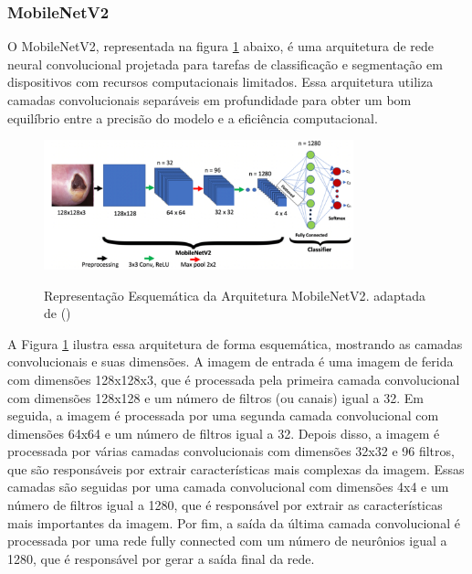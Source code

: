     \subsubsection{MobileNetV2}

        O \ac{MobileNetV2}, representada na figura \ref{fig:arquiteturaMobileNetV2} abaixo, é uma arquitetura de rede neural convolucional projetada para tarefas de classificação e segmentação em dispositivos com recursos computacionais limitados. Essa arquitetura utiliza camadas convolucionais separáveis em profundidade para obter um bom equilíbrio entre a precisão do modelo e a eficiência computacional.
    
            \begin{figure}[htbp]
                \centering
                \caption{Representação Esquemática da Arquitetura \ac{MobileNetV2}. adaptada de (\cite{akay2021deep})}
                \includegraphics[width=0.8\textwidth]{img/arquitetura_MobileNetV2.png}
                \label{fig:arquiteturaMobileNetV2}
            \end{figure}   
    
        A Figura \ref{fig:arquiteturaMobileNetV2} ilustra essa arquitetura de forma esquemática, mostrando as camadas convolucionais e suas dimensões. A imagem de entrada é uma imagem de ferida com dimensões 128x128x3, que é processada pela primeira camada convolucional com dimensões 128x128 e um número de filtros (ou canais) igual a 32. Em seguida, a imagem é processada por uma segunda camada convolucional com dimensões 64x64 e um número de filtros igual a 32. Depois disso, a imagem é processada por várias camadas convolucionais com dimensões 32x32 e 96 filtros, que são responsáveis por extrair características mais complexas da imagem. Essas camadas são seguidas por uma camada convolucional com dimensões 4x4 e um número de filtros igual a 1280, que é responsável por extrair as características mais importantes da imagem. Por fim, a saída da última camada convolucional é processada por uma rede fully connected com um número de neurônios igual a 1280, que é responsável por gerar a saída final da rede.

